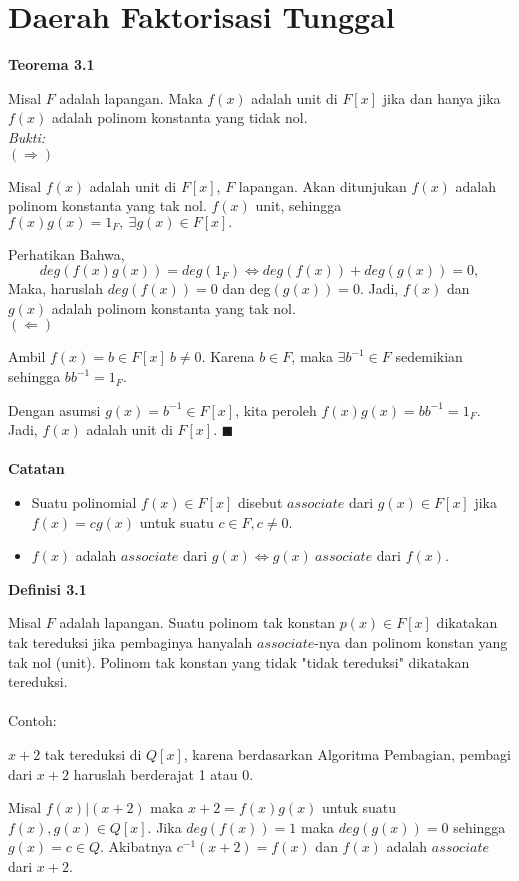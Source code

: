 
\chapter{Daerah Faktorisasi Tunggal}
\textbf{Teorema 3.1}
\par 	Misal $F$ adalah lapangan. Maka $f(x)$ adalah unit di $F[x]$ jika dan hanya jika $f(x)$ adalah polinom konstanta yang tidak nol.
\\
	\textit{Bukti:}
\\ $(\Rightarrow)$
\par 	Misal $f(x)$ adalah unit di $F[x]$, $F$ lapangan. Akan ditunjukan $f(x)$ adalah polinom konstanta yang tak nol. $f(x)$ unit, sehingga $f(x)g(x)=1_F, ~ \exists g(x) \in F[x].$
\par 	Perhatikan Bahwa, $$deg(f(x)g(x))=deg(1_F) \iff deg(f(x))+deg(g(x))=0,$$  Maka, haruslah $deg(f(x))=0$ dan deg$(g(x))=0.$ Jadi, $f(x)$ dan $g(x)$ adalah polinom konstanta yang tak nol.
\\ $(\Leftarrow)$
\par 	Ambil $f(x)=b \in F[x]~b \ne 0.$ Karena $b \in F$, maka $\exists b^{-1} \in F$ sedemikian sehingga $bb^{-1}=1_F.$ 
\par 	Dengan asumsi $g(x)=b^{-1} \in F[x]$, kita peroleh $f(x)g(x)=bb^{-1}=1_F.$ Jadi, $f(x)$ adalah unit di $F[x].$ $\blacksquare$
\\	
\\
	\textbf{Catatan}
\begin{itemize}
\item Suatu polinomial $f(x) \in F[x]$ disebut $associate$ dari $g(x) \in F[x]$ jika $f(x)=cg(x)$ untuk suatu $c \in F, c \ne 0.$
\item $f(x)$ adalah $associate$ dari $g(x) \iff g(x)~associate$ dari $f(x).$ 
\end{itemize}
\textbf {Definisi 3.1}
\par Misal $F$ adalah lapangan. Suatu polinom tak konstan $p(x) \in F[x]$ dikatakan tak tereduksi jika pembaginya hanyalah $associate$-nya dan polinom konstan yang tak nol (unit). Polinom tak konstan yang tidak "tidak tereduksi" dikatakan tereduksi.
\\
\\ Contoh:
\par $x+2$ tak tereduksi di $Q[x]$, karena berdasarkan Algoritma Pembagian, pembagi dari $x+2$ haruslah berderajat 1 atau 0.
\par 	Misal $f(x)|(x+2)$ maka $x+2=f(x)g(x)$ untuk suatu $f(x),g(x) \in Q[x].$ Jika $deg(f(x))=1$ maka $deg(g(x))=0$ sehingga $g(x)=c \in Q$. Akibatnya $c^{-1}(x+2)=f(x)$ dan $f(x)$ adalah $associate$ dari $x+2$.
